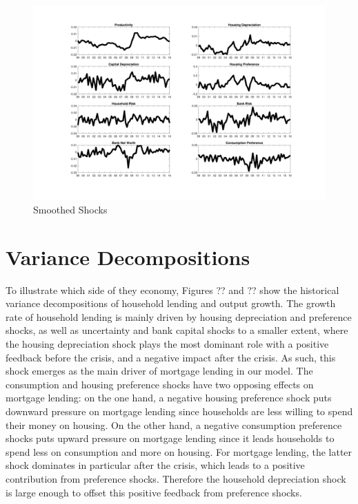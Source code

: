 \documentclass[12pt]{article}
\numberwithin{equation}{section}
\begin{document}
\begin{figure}[H]
\caption{Smoothed Shocks}
\includegraphics[scale=0.55]{smoothed_shocks.pdf}
\end{figure}



\section*{Variance Decompositions}




To illustrate which side of they economy, Figures ?? and ?? show the historical variance decompositions of household lending and output growth. The growth rate of household lending is mainly driven by housing depreciation and preference shocks, as well as uncertainty and bank capital shocks to a smaller extent, where the housing depreciation shock plays the most dominant role with a positive feedback before the crisis, and a negative impact after the crisis. As such, this shock emerges as the main driver of mortgage lending in our model. The consumption and housing preference shocks have two opposing effects on mortgage lending: on the one hand, a negative housing preference shock puts downward pressure on mortgage lending since households are less willing to spend their money on housing. On the other hand, a negative consumption preference shocks puts upward pressure on mortgage lending since it leads households to spend less on consumption and more on housing. For mortgage lending, the latter shock dominates in particular after the crisis, which leads to a positive contribution from preference shocks. Therefore the household depreciation shock is large enough to offset this positive feedback from preference shocks. 
\end{document}

